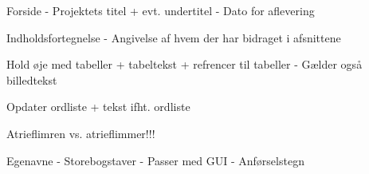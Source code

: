 Forside
- Projektets titel + evt. undertitel
- Dato for aflevering

Indholdsfortegnelse
- Angivelse af hvem der har bidraget i afsnittene

Hold øje med tabeller + tabeltekst + refrencer til tabeller
- Gælder også billedtekst

Opdater ordliste + tekst ifht. ordliste

Atrieflimren vs. atrieflimmer!!!

Egenavne
- Storebogstaver
- Passer med GUI
- Anførselstegn


